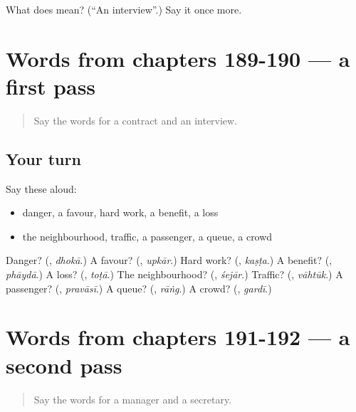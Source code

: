 \begin{tcolorbox}[breakable,colback=teal!4,colframe=teal!35!black,title={Before you move on}]
What does  mean? (\textquotedblleft{}An interview\textquotedblright{}.) Say it once more.
\end{tcolorbox}
\section[(dialogue)]{Words from chapters 189-190 — a first pass}

\label{lesson:MR-R192-first-pass-words-from-chapters-189-190}



\begin{quote}
Say the words for a contract and an interview.
\end{quote}

\subsection*{Your turn}
Say these aloud:

\begin{itemize}
\raggedright
  \item danger, a favour, hard work, a benefit, a loss
  \item the neighbourhood, traffic, a passenger, a queue, a crowd
\end{itemize}

\begin{tcolorbox}[breakable,colback=teal!4,colframe=teal!35!black,title={Before you move on}]
Danger? (\textbf{}, \emph{dhokā}.) A favour? (\textbf{}, \emph{upkār}.) Hard work? (\textbf{}, \emph{kaṣṭa}.) A benefit? (\textbf{}, \emph{phāydā}.) A loss? (\textbf{}, \emph{toṭā}.) The neighbourhood? (\textbf{}, \emph{śejār}.) Traffic? (\textbf{}, \emph{vāhtūk}.) A passenger? (\textbf{}, \emph{pravāsī}.) A queue? (\textbf{}, \emph{rāṅg}.) A crowd? (\textbf{}, \emph{gardī}.)
\end{tcolorbox}
\section[(dialogue)]{Words from chapters 191-192 — a second pass}

\label{lesson:MR-R192-second-pass-words-from-chapters-191-192}



\begin{quote}
Say the words for a manager and a secretary.
\end{quote}

